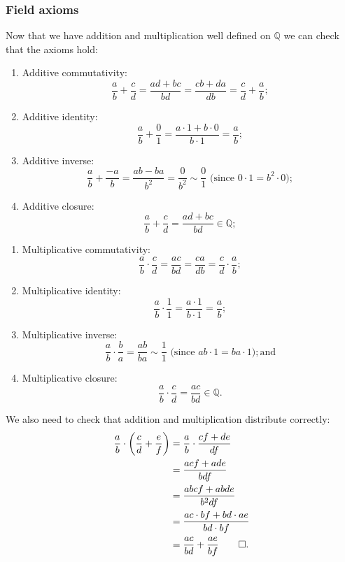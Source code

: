 \documentclass[]{scrartcl}
\theoremstyle{definition}
\newcommand{\bb}[1]{\mathbb{#1}}
\newcommand{\Q}{\bb{Q}}
\begin{document}
\subsubsection{Field axioms}
Now that we have addition and multiplication well defined on $\Q$ we can check that the axioms hold:
\begin{enumerate}[label=A\arabic*.]
    \item Additive commutativity: $$\frac{a}{b} + \frac{c}{d} = \frac{ad+bc}{bd} = \frac{cb + da}{db} = \frac{c}{d} + \frac{a}{b};$$
    \item Additive identity: $$\frac{a}{b} + \frac{0}{1} = \frac{a\cdot 1 + b\cdot0}{b\cdot 1} = \frac{a}{b};$$
    \item Additive inverse: $$\frac{a}{b} + \frac{-a}{b} = \frac{ab - ba}{b^2} = \frac{0}{b^2} \sim \frac{0}{1}\text{ (since } 0\cdot1 = b^2\cdot 0 \text{)};$$
    \item Additive closure: $$\frac{a}{b} + \frac{c}{d} = \frac{ad+bc}{bd} \in \Q;$$
\end{enumerate}
\begin{enumerate}[label=M\arabic*.]
    \item Multiplicative commutativity: $$\frac{a}{b} \cdot \frac{c}{d} = \frac{ac}{bd} = \frac{ca}{db} = \frac{c}{d} \cdot \frac{a}{b};$$
    \item Multiplicative identity: $$\frac{a}{b} \cdot \frac{1}{1} = \frac{a\cdot 1}{b\cdot 1} = \frac{a}{b};$$
    \item Multiplicative inverse: $$\frac{a}{b} \cdot \frac{b}{a} = \frac{ab}{ba} \sim \frac{1}{1} \text{ (since } ab\cdot 1 = ba\cdot 1 \text{)}; \text{and}$$
    \item Multiplicative closure: $$\frac{a}{b} \cdot \frac{c}{d} = \frac{ac}{bd} \in \Q.$$
\end{enumerate}
We also need to check that addition and multiplication distribute correctly:
\begin{align*}
\frac{a}{b}\cdot\left(\frac{c}{d} + \frac{e}{f}\right) &=
    \frac{a}{b}\cdot\frac{cf + de}{df} \\
&= \frac{acf +ade}{bdf} \\
&= \frac{abcf +abde}{b^2df} \\
&= \frac{ac\cdot bf + bd\cdot ae}{bd\cdot bf} \\
&= \frac{ac}{bd} + \frac{ae}{bf} \qed.
\end{align*}
\end{document}
